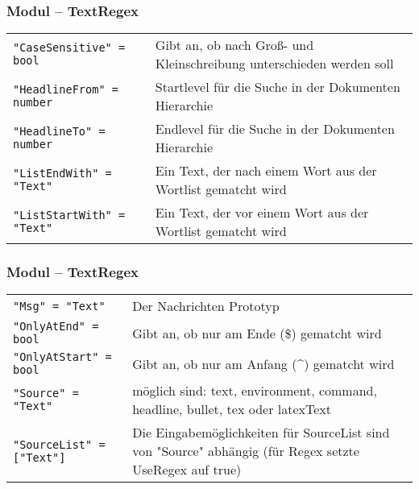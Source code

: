 \begin{frame}[fragile]
\frametitle{Modul -- TextRegex}
\begin{block}{\vspace*{-3ex}}
\begin{table}[h]
	\begin{tabular}{l|p{5cm}}
		\lstinline|"CaseSensitive" = bool| & Gibt an, ob nach Groß- und Kleinschreibung unterschieden werden soll\\
		\lstinline|"HeadlineFrom" = number| & Startlevel für die Suche in der Dokumenten Hierarchie\\
		\lstinline|"HeadlineTo" = number| & Endlevel für die Suche in der Dokumenten Hierarchie\\
		\lstinline|"ListEndWith" = "Text"| & Ein Text, der nach einem Wort aus der Wortlist gematcht wird\\
		\lstinline|"ListStartWith" = "Text"| & Ein Text, der vor einem Wort aus der Wortlist gematcht wird
	\end{tabular}
\end{table}
\end{block}
\end{frame}

\begin{frame}[fragile]
\frametitle{Modul -- TextRegex}
\begin{block}{\vspace*{-3ex}}
\begin{table}[h]
	\begin{tabular}{l|p{5cm}}
			\lstinline|"Msg" = "Text"| & Der Nachrichten Prototyp\\
			\lstinline|"OnlyAtEnd" = bool| & Gibt an, ob nur am Ende (\$) gematcht wird\\
			\lstinline|"OnlyAtStart" = bool| & Gibt an, ob nur am Anfang (\textasciicircum) gematcht wird\\
			\lstinline|"Source" = "Text"| & möglich sind: text, environment, command, headline, bullet, tex oder latexText\\
			\lstinline|"SourceList" = ["Text"]| & Die Eingabemöglichkeiten für SourceList sind von "Source" abhängig (für Regex setzte UseRegex auf true)
	\end{tabular}
\end{table}
\end{block}
\end{frame}

